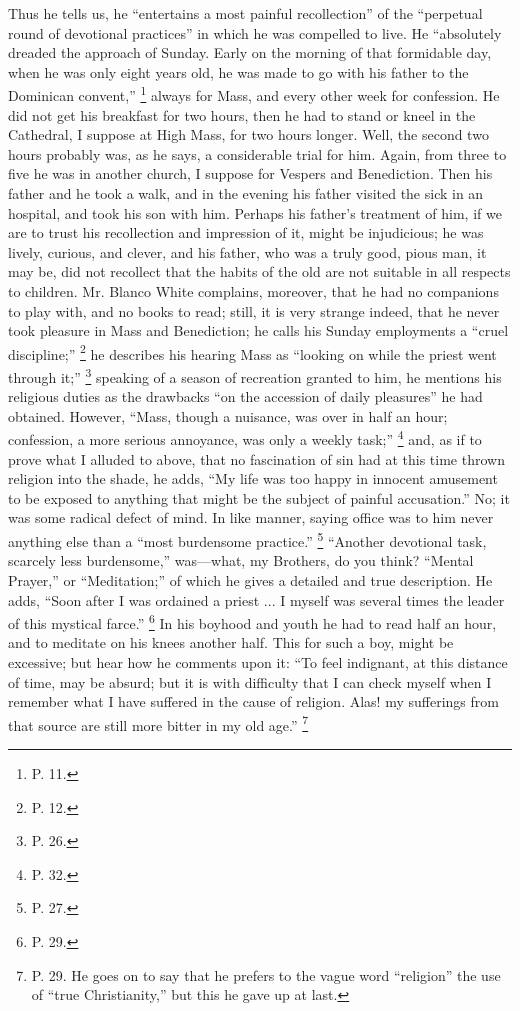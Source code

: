 Thus he tells us, he ``entertains a most painful
recollection'' of the ``perpetual round of
devotional practices'' in which he was compelled to
live. He ``absolutely dreaded the approach of Sunday.
Early on the morning of that formidable day, when he was
only eight years old, he was made to go with his father
to the Dominican convent,'' \footnote{P. 11.} always for Mass,
and every other week for confession. He did not get his
breakfast for two hours, then he had to stand or kneel in
the Cathedral, I suppose at High Mass, for two hours
longer. Well, the second two hours probably was, as he
says, a considerable trial for him. Again, from three to
five he was in another church, I suppose for Vespers and
Benediction. Then his father and he took a walk, and in
the evening his father visited the sick in an hospital,
and took his son with him. Perhaps his father's treatment
of him, if we are to trust his recollection and
impression of it, might be injudicious; he was lively,
curious, and clever, and his father, who was a truly
good, pious man, it may be, did not recollect that the
habits of the old are not suitable in all respects to
children. Mr. Blanco White complains, moreover, that he
had no companions to play with, and no books to read;
still, it is very strange indeed, that he never took
pleasure in Mass and Benediction; he calls his Sunday
employments a ``cruel discipline;'' \footnote{P. 12.} he
describes his hearing Mass as ``looking on while the
priest went through it;'' \footnote{P. 26.} speaking of a
season of recreation granted to him, he mentions his
religious duties as the drawbacks ``on the accession
of daily pleasures'' he had obtained. However,
``Mass, though a nuisance, was over in half an hour;
confession, a more serious annoyance, was only a weekly
task;'' \footnote{P. 32.} and, as if to prove what I alluded
to above, that no fascination of sin had at this time
thrown religion into the shade, he adds, ``My life
was too happy in innocent amusement to be exposed to
anything that might be the subject of painful
accusation.'' No; it was some radical defect of mind.
In like manner, saying office was to him never anything
else than a ``most burdensome practice.'' \footnote{P. 27.} ``Another devotional task, scarcely less
burdensome,'' was—what, my Brothers, do you
think? ``Mental Prayer,'' or
``Meditation;'' of which he gives a detailed and
true description. He adds, ``Soon after I was
ordained a priest ... I myself was several times the
leader of this mystical farce.'' \footnote{P. 29.} In his
boyhood and youth he had to read half an hour, and to
meditate on his knees another half. This for such a boy,
might be excessive; but hear how he comments upon it:
``To feel indignant, at this distance of time, may be
absurd; but it is with difficulty that I can check myself
when I remember what I have suffered in the cause of
religion. Alas! my sufferings from that source are still
more bitter in my old age.'' \footnote{P. 29. He goes on to say that
he prefers to the vague word ``religion'' the use
of ``true Christianity,'' but this he gave up at
last.}

